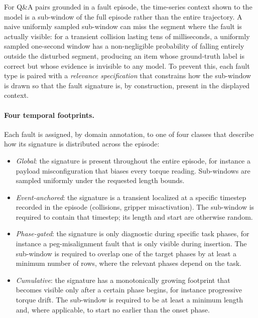 For Q\&A pairs grounded in a fault episode, the time-series context shown to the model is a sub-window of the full episode rather than the entire trajectory. A naive uniformly sampled sub-window can miss the segment where the fault is actually visible: for a transient collision lasting tens of milliseconds, a uniformly sampled one-second window has a non-negligible probability of falling entirely outside the disturbed segment, producing an item whose ground-truth label is correct but whose evidence is invisible to any model. To prevent this, each fault type is paired with a \emph{relevance specification} that constrains how the sub-window is drawn so that the fault signature is, by construction, present in the displayed context.

\paragraph{Four temporal footprints.} Each fault is assigned, by domain annotation, to one of four classes that describe how its signature is distributed across the episode:

\begin{itemize}
    \item \emph{Global}: the signature is present throughout the entire episode, for instance a payload misconfiguration that biases every torque reading. Sub-windows are sampled uniformly under the requested length bounds.
    \item \emph{Event-anchored}: the signature is a transient localized at a specific timestep recorded in the episode (collisions, gripper misactivation). The sub-window is required to contain that timestep; its length and start are otherwise random.
    \item \emph{Phase-gated}: the signature is only diagnostic during specific task phases, for instance a peg-misalignment fault that is only visible during insertion. The sub-window is required to overlap one of the target phases by at least a minimum number of rows, where the relevant phases depend on the task.
    \item \emph{Cumulative}: the signature has a monotonically growing footprint that becomes visible only after a certain phase begins, for instance progressive torque drift. The sub-window is required to be at least a minimum length and, where applicable, to start no earlier than the onset phase.
\end{itemize}

